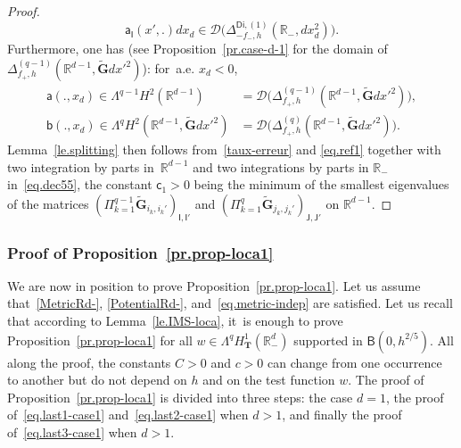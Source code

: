 \documentclass[JEP,XML,SOM,Unicode,NoEqCountersInSection,NoFloatCountersInSection,published]{cedram}
\newcommand{\mbf}[1]{\mathbf{#1}}
\theoremstyle{plain}
\theoremstyle{definition}
\begin{document}
\begin{proof}
\[
\mathsf a_{\mathsf I}(x',.) dx_d \in \mathcal D\bigl(\Delta_{-f_-,h}^{\mathsf{Di},(1)}(\mathbb R_-, dx_d^2) \bigr).
\]
Furthermore, one has (see Proposition~\ref{pr.case-d-1} for the
domain of $ \Delta_{f_+,h}^{(q-1)}(\mathbb R^{d-1}, \tilde{\mbf G}dx'^2)$): for~a.e. $x_d< 0$,
\begin{align*}
\mathsf a(.,x_d) \in \Lambda^{q-1}H^2 (\mathbb R^{d-1}) &= \mathcal D\bigl(\Delta_{f_+,h}^{(q-1)}(\mathbb R^{d-1}, \tilde{\mbf G}dx'^2)\bigr),
\\
\mathsf b(.,x_d) \in \Lambda^{q}H^2 (\mathbb R^{d-1}, \tilde{\mbf G}dx'^2)&= \mathcal D\bigl(\Delta_{f_+,h}^{(q)}(\mathbb R^{d-1}, \tilde{\mbf G}dx'^2)\bigr).
\end{align*}
Lemma~\ref{le.splitting} then follows from~\eqref{taux-erreur} and \eqref{eq.ref1} together with two integration by parts in~$\mathbb R^{d-1}$ and two integrations by parts in $\mathbb R_-$ in~\eqref{eq.dec55}, the constant $\mathsf c_1 >0$ being the minimum of the smallest eigenvalues of the matrices $(\Pi_{k=1}^{q-1} \tilde{\mbf G}_{i_k,i_k'})_{\mathsf I,\mathsf I'}$ and $ (\Pi_{k=1}^{q} \tilde{\mbf G}_{j_k,j_k'})_{\mathsf J,\mathsf J'}$ on $\mathbb R^{d-1}$.
\end{proof}

\subsubsection{Proof of Proposition~\ref{pr.prop-loca1}}\label{sec:prop-loca1-proof}
We are now in position to prove Proposition~\ref{pr.prop-loca1}.
Let us assume that~\ref{MetricRd-}, \ref{PotentialRd-}, and~\eqref{eq.metric-indep} are satisfied. Let us recall that according to Lemma~\ref{le.IMS-loca}, it~is enough to prove Proposition~\ref{pr.prop-loca1} for all
$w\in \Lambda^q H^1_{\mbf T}(\mathbb R^d_-)$ supported in $\mathsf B(0,h^{2/5 })$. All along the proof, the constants $C>0$ and $c>0$ can change from one occurrence to another but do not depend on $h$ and on the test function $w$.
The proof of Proposition~\ref{pr.prop-loca1} is divided into three
steps: the case $d=1$, the proof of~\eqref{eq.last1-case1}
and~\eqref{eq.last2-case1} when $d>1$, and finally the proof of~\eqref{eq.last3-case1} when $d>1$.
\end{document}
